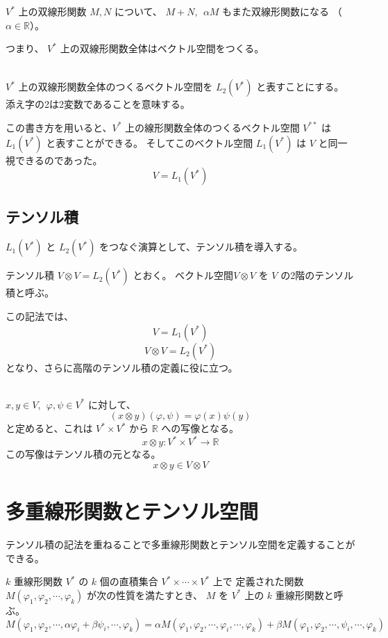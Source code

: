 \documentclass[uplatex,a4j,12pt,dvipdfmx]{jsarticle}
\begin{document}
${}$

$V^{*}$ 上の双線形関数 $M, N$ について、
$M + N, \ \ \alpha M$ もまた双線形関数になる
（$\alpha \in \mathbb{R}$）。

つまり、 $V^{*}$ 上の双線形関数全体はベクトル空間をつくる。

\ \\

$V^{*}$ 上の双線形関数全体のつくるベクトル空間を $L_{2}(V^{*})$ と表すことにする。
添え字の2は2変数であることを意味する。

この書き方を用いると、$V^{*}$ 上の線形関数全体のつくるベクトル空間 $V^{**}$ は
$L_{1}(V^{*})$ と表すことができる。
そしてこのベクトル空間 $L_{1}(V^{*})$ は $V$ と同一視できるのであった。
$$
	V = L_{1}(V^{*})
$$

\subsection{テンソル積}

$L_{1}(V^{*})$ と $L_{2}(V^{*})$ をつなぐ演算として、テンソル積を導入する。

\begin{itembox}[l]{テンソル積}
	$V \otimes V = L_{2}(V^{*})$ とおく。
	ベクトル空間$V \otimes V$ を $V$ の2階のテンソル積と呼ぶ。
\end{itembox}

この記法では、
$$V = L_{1}(V^{*})$$
$$V \otimes V = L_{2}(V^{*})$$
となり、さらに高階のテンソル積の定義に役に立つ。

\ \\

$x,y \in V, \ \ \varphi, \psi \in V^{*}$ に対して、
$$
	(x \otimes y)(\varphi, \psi) = \varphi(x) \psi(y)
$$
と定めると、これは
$V^{*} \times V^{*}$
から
$\mathbb{R}$ への写像となる。
$$
	x \otimes y : V^{*} \times V^{*} \to \mathbb{R}
$$
この写像はテンソル積の元となる。
$$
	x \otimes y \in V \otimes V
$$

\section{多重線形関数とテンソル空間}

テンソル積の記法を重ねることで多重線形関数とテンソル空間を定義することができる。

\begin{itembox}[l]{$k$ 重線形関数}
	$V^{*}$ の $k$ 個の直積集合 $V^{*} \times \cdots \times V^{*}$ 上で
	定義された関数
	$M(\varphi_{1}, \varphi_{2}, \cdots , \varphi_{k})$
	が次の性質を満たすとき、
	$M$ を $V^{*}$ 上の $k$ 重線形関数と呼ぶ。
	$$
		M(\varphi_{1}, \varphi_{2}, \cdots , \alpha \varphi_{i} + \beta \psi_{i} , \cdots , \varphi_{k})
		=
		\alpha M(\varphi_{1}, \varphi_{2}, \cdots , \varphi_{i} , \cdots , \varphi_{k})
		+
		\beta M(\varphi_{1}, \varphi_{2}, \cdots , \psi_{i} , \cdots , \varphi_{k})
	$$
\end{itembox}
\end{document}
